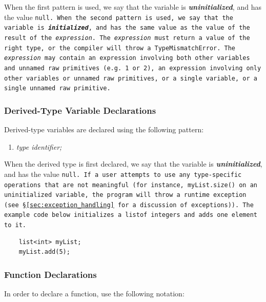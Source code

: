 \documentclass{report}
\begin{document}
When the first pattern is used, we say that the variable is
\textbf{\emph{uninitialized}}, and has the value \tt null\rm. When the second
pattern is used, we say that the variable is \textbf{\emph{initialized}}, and has
the same value as the value of the result of the \emph{expression}. The
\emph{expression} must return a value of the right type, or the compiler will
throw a \tt TypeMismatchError\rm. The \emph{expression} may contain an expression
involving both other variables and unnamed raw primitives (e.g. 1 or 2), an
expression involving only other variables or unnamed raw primitives, or a single
variable, or a single unnamed raw primitive.


\subsubsection{Derived-Type Variable Declarations} %
\label{ssub:derived_type_variable_declarations}

Derived-type variables are declared using the following pattern:

\begin{enumerate}
  \item \emph{type identifier;}
\end{enumerate}

When the derived type is first declared, we say that the variable is
\textbf{\emph{uninitialized}}, and has the value \tt null\rm. If a user
attempts to use any type-­specific operations that are not meaningful (for
instance, \tt myList.size() \rm on an uninitialized variable, the program will
throw a run­time exception (see \S \ref{sec:exception_handling} for a
discussion of exceptions)). The example code below initializes a \tt list\rm of
integers and adds one element to it.

\begin{verbatim}
    list<int> myList;
    myList.add(5);
\end{verbatim}


\subsubsection{Function Declarations} %
\label{ssub:function_declarations}

In order to declare a function, use the following notation:
\end{document}
